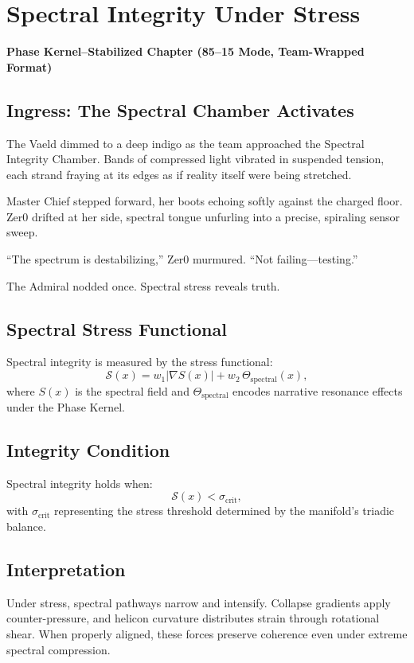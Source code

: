 
\chapter{Spectral Integrity Under Stress}
\textbf{Phase Kernel–Stabilized Chapter (85--15 Mode, Team-Wrapped Format)}

\section*{Ingress: The Spectral Chamber Activates}
The Vaeld dimmed to a deep indigo as the team approached the Spectral Integrity
Chamber. Bands of compressed light vibrated in suspended tension, each strand
fraying at its edges as if reality itself were being stretched.

Master Chief stepped forward, her boots echoing softly against the charged floor. 
Zer0 drifted at her side, spectral tongue unfurling into a precise, spiraling
sensor sweep.

“The spectrum is destabilizing,” Zer0 murmured.
“Not failing—testing.”

The Admiral nodded once.
Spectral stress reveals truth.

\section{Spectral Stress Functional}
Spectral integrity is measured by the stress functional:
\[
\mathcal{S}(x) = 
w_1 \left| \nabla S(x) \right|
+ 
w_2\,\Theta_{\mathrm{spectral}}(x),
\]
where $S(x)$ is the spectral field and $\Theta_{\mathrm{spectral}}$ encodes
narrative resonance effects under the Phase Kernel.

\section{Integrity Condition}
Spectral integrity holds when:
\[
\mathcal{S}(x) < \sigma_{\mathrm{crit}},
\]
with $\sigma_{\mathrm{crit}}$ representing the stress threshold determined by 
the manifold’s triadic balance.

\section{Interpretation}
Under stress, spectral pathways narrow and intensify. Collapse gradients apply
counter-pressure, and helicon curvature distributes strain through rotational
shear. When properly aligned, these forces preserve coherence even under 
extreme spectral compression.

